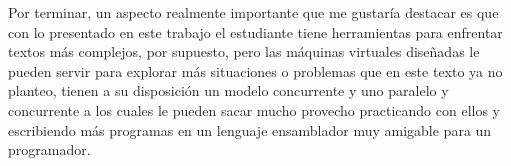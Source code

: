 \documentclass[letterpaper,12pt,oneside]{book}
\begin{document}
			
			Por terminar, un aspecto realmente importante que me gustaría destacar es que con lo presentado en este trabajo el estudiante
			tiene herramientas para enfrentar textos más complejos, por supuesto, pero las máquinas virtuales diseñadas le pueden servir
			para explorar más situaciones o problemas que en este texto ya no planteo, tienen a su disposición un modelo
			concurrente y uno paralelo y concurrente a los cuales le pueden sacar mucho provecho practicando con ellos y escribiendo
			más programas en un lenguaje ensamblador muy amigable para un programador.
\newpage                                                                                                                                                                                                                                                                                                                                                                                                                                                                                                                                                                                                                                                                                                                                                                                                                                                                                                                                                                                                                                                                                                                                                                                                                                                                                                                                                                                                                                                                                                                                                                                                                                                                                                                                                                              

	
	

\end{document}
